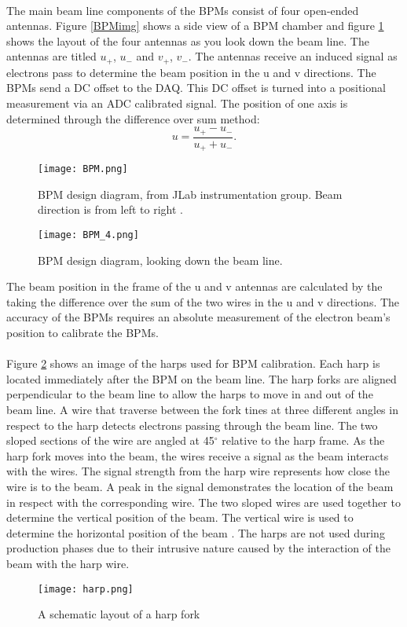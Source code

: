  \paragraph{} The main beam line components of the BPMs consist of four open-ended antennas. Figure \ref{BPMimg} shows a side view of a BPM chamber and figure \ref{BPM_4} shows the layout of the four antennas as you look down the beam line. The antennas are titled $u_+$, $u_-$ and $v_+$, $v_-$. The antennas receive an induced signal as electrons pass to determine the beam position in the u and v directions. The BPMs send a DC offset to the DAQ. This DC offset is turned into a positional measurement via an ADC calibrated signal. The position of one axis is determined through the difference over sum method:
 \begin{equation}
 	u = \frac{u_+ - u_-}{u_+ + u_-}.
 \end{equation} 
  	\begin{figure}[H]
 	\centering
 	\texttt{[image: BPM.png]} 
 	\caption{BPM design diagram, from JLab instrumentation	group. Beam direction is from left to right \cite{BPM2}. }
 	\label{BPMimg}
 	\vspace{1.5cm}
 	\texttt{[image: BPM\_4.png]}  	
 	\caption{BPM design diagram, looking down the beam line\cite{BPM2}. }
 	\label{BPM_4}
 \end{figure} 
  
 
 The beam position in the frame of the u and v antennas are calculated by the taking the difference over the sum of the two wires in the u and v directions. The accuracy of the BPMs requires an absolute measurement of the electron beam's position to calibrate the BPMs\cite{BPM,BPM2}.

\paragraph{} Figure \ref{harp} shows an image of the harps used for BPM calibration. Each harp is located immediately after the BPM on the beam line. The harp forks are aligned perpendicular to the beam line to allow the harps to move in and out of the beam line. A wire that traverse between the fork tines at three different angles in respect to the harp detects electrons passing through the beam line. The two sloped sections of the wire are angled at 45$^{\circ}$ relative to the harp frame. As the harp fork moves into the beam, the wires receive a signal as the beam interacts with the wires. The signal strength from the harp wire represents how close the wire is to the beam. A peak in the signal demonstrates the location of the beam in respect with the corresponding wire. The two sloped wires are used together to determine the vertical position of the beam. The vertical wire is used to determine the horizontal position of the beam \cite{BPM,BPM2}. The harps are not used during production phases due to their intrusive nature caused by the interaction of the beam with the harp wire.
		\begin{figure}[t]
			\centering
			\caption{A schematic layout of a harp fork \cite{BPM2} }
			\label{harp}
			\texttt{[image: harp.png]} 
		\end{figure}  	
		
